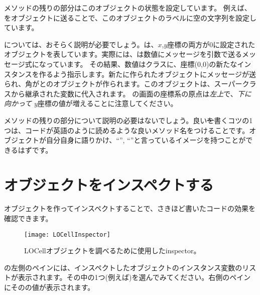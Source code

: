 \documentclass[a4paper,10pt,twoside]{book}
\begin{document}
メソッドの残りの部分はこのオブジェクトの状態を設定しています。
例えば、をオブジェクトに送ることで、このオブジェクトのラベルに空の文字列を設定しています。

については、おそらく説明が必要でしょう。は、$x$,$y$座標の両方が0に設定されたオブジェクトを表しています。実際には、は数値にメッセージを引数で送るメッセージ式になっています。
その結果、数値はクラスに、座標(0,0)の新たなインスタンスを作るよう指示します。新たに作られたオブジェクトにメッセージが送られ、角がとのオブジェクトが作られます。このオブジェクトは、スーパークラスから継承された変数に代入されます。
\pharo の画面の座標系の原点は\emph{左上}で、\emph{下に向かって} $y$座標の値が増えることに注意してください。

メソッドの残りの部分について説明の必要はないでしょう。良い\st を書くコツの1つは、コードが英語のように読めるような良いメソッド名をつけることです。オブジェクトが自分自身に語りかけ、``'', ``''と言っているイメージを持つことができるはずです。

\section{オブジェクトをインスペクトする}

オブジェクトを作ってインスペクトすることで、さきほど書いたコードの効果を確認できます。


\begin{figure}[htbp]
   \centering
   \texttt{[image: LOCellInspector]}
   \caption{LOCellオブジェクトを調べるために使用したinspector。}
\end{figure}

の左側のペインには、インスペクトしたオブジェクトのインスタンス変数のリストが表示されます。その中の1つ(例えば\mbox{})を選んでみてください。右側のペインにそのの値が表示されます。
\end{document}
